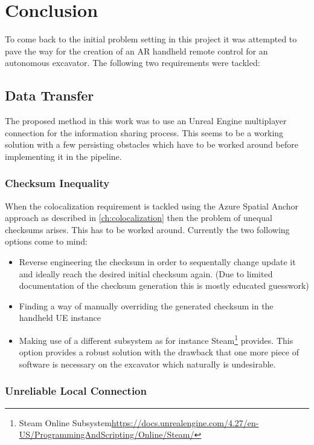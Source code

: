 \chapter{Conclusion}\label{sec:conclusion}

To come back to the initial problem setting in this project it was attempted to pave the way for the creation of an AR handheld remote control for an autonomous excavator. The following two requirements were tackled:

\section{Data Transfer}\label{sec:conc_data_transfer}
The proposed method in this work was to use an Unreal Engine multiplayer connection for the information sharing process. This seems to be a working solution with a few persisting obstacles which have to be worked around before implementing it in the pipeline. 

\subsection{Checksum Inequality}\label{subsec:checksum_error}

When the colocalization requirement is tackled using the Azure Spatial Anchor approach as described in \cref{ch:colocalization} then the problem of unequal checksums arises. This has to be worked around. Currently the two following options come to mind:
\begin{itemize}
    \item Reverse engineering the checksum in order to sequentally change update it and ideally reach the desired initial checksum again. (Due to limited documentation of the checksum generation this is mostly educated guesswork)
    \item Finding a way of manually overriding the generated checksum in the handheld UE instance
    \item Making use of a different subsystem as for instance Steam\footnote{Steam Online Subsystem\url{https://docs.unrealengine.com/4.27/en-US/ProgrammingAndScripting/Online/Steam/}} provides. This option provides a robust solution with the drawback that one more piece of software is necessary on the excavator which naturally is undesirable.
\end{itemize}

\subsection{Unreliable Local Connection}\label{subsec:unrealiable_connection}


